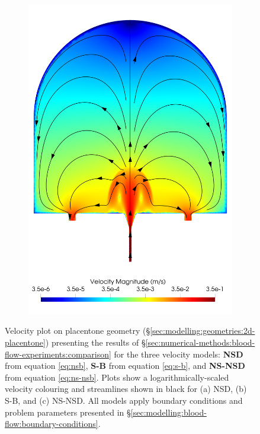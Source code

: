\begin{figure}
\begin{subfigure}[b]{0.45\textwidth}
                    \includegraphics[width=\textwidth]{diagrams/results-modelling/velocity-transport/meshandsoln_dg_velocity_placentone_ns-nsb_velocity-log.png}
                    \caption{}
                    \label{fig:4-models-placentone:ns-nsb}
                \end{subfigure}
                \caption{Velocity plot on placentone geometry (\S\ref{sec:modelling:geometries:2d-placentone}) presenting the results of \S\ref{sec:numerical-methods:blood-flow-experiments:comparison} for the three velocity models: \textbf{NSD} from equation \eqref{eq:nsb}, \textbf{S-B} from equation \eqref{eq:s-b}, and \textbf{NS-NSD} from equation \eqref{eq:ns-nsb}. Plots show a logarithmically-scaled velocity colouring and streamlines shown in black for (a) NSD, (b) S-B, and (c) NS-NSD. All models apply boundary conditions and problem parameters presented in \S\ref{sec:modelling:blood-flow:boundary-conditions}.}
                \label{fig:4-models-placentone}
            \end{figure}
    
